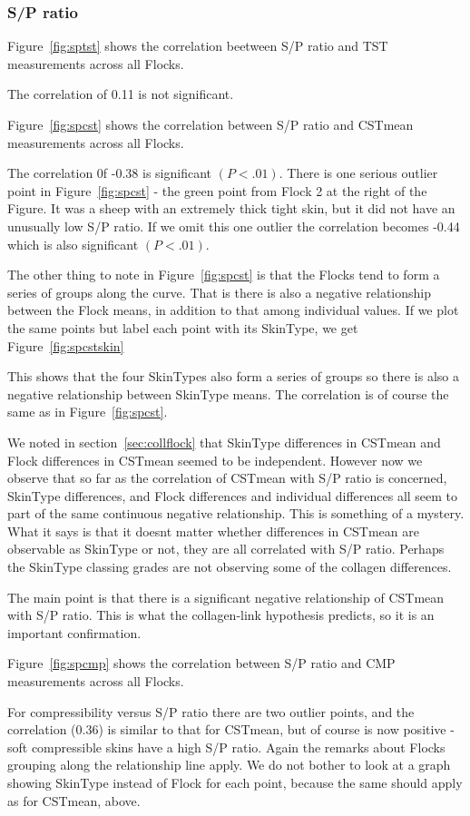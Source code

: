 \documentclass[titlepage]{article}  %
\begin{document}
\subsubsection{S/P ratio}
 Figure~\ref{fig:sptst} shows the correlation beetween S/P ratio and TST measurements across all Flocks.

The correlation of 0.11 is not significant.

 Figure~\ref{fig:spcst} shows the correlation between S/P ratio and CSTmean measurements across all Flocks.

The correlation 0f -0.38 is significant $(P<.01)$. There is one serious outlier point in Figure~\ref{fig:spcst} - the green point from Flock 2 at the right of the Figure. It was a sheep with an extremely thick tight skin, but it did not have an unusually low S/P ratio. If we omit this one outlier the correlation becomes -0.44 which is also significant $(P<.01)$.

The other thing to note in Figure~\ref{fig:spcst} is that the Flocks tend to form a series of groups along the curve. That is there is  also a negative relationship between the Flock means, in addition to that among individual values. 
If we plot the same points but label each point with its SkinType, we get Figure~\ref{fig:spcstskin}

This shows that the four SkinTypes also form a series of groups so there is also a negative relationship between SkinType means. The correlation is of course the same as in Figure~\ref{fig:spcst}.

We noted in section~\ref{sec:collflock} that SkinType differences in CSTmean and Flock differences in CSTmean seemed to be independent. However now we observe that so far as the correlation of CSTmean with S/P ratio is concerned, SkinType differences, and Flock differences and individual differences all seem to part of the same continuous negative relationship. This is something of a mystery. What it says is that it doesnt matter whether differences in CSTmean are observable as SkinType or not, they are all correlated with S/P ratio. Perhaps the SkinType classing grades are not observing some of the collagen differences.

The main point is that there is a significant negative relationship of CSTmean with S/P ratio. This is what the collagen-link hypothesis predicts, so it is an important confirmation.

 Figure~\ref{fig:spcmp} shows the correlation between S/P ratio and CMP measurements across all Flocks.

For compressibility versus S/P ratio there are two outlier points, and the correlation (0.36) is similar to that for CSTmean, but of course is now positive - soft compressible skins have a high S/P ratio. Again the remarks about Flocks grouping along the relationship line apply. We do not bother to look at a graph showing SkinType instead of Flock for each point, because the same should apply as for CSTmean, above.
\end{document}
